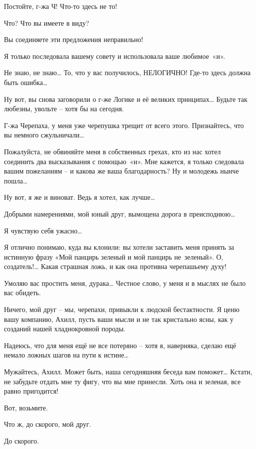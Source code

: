 \documentclass[../main.tex]{subfiles}
\begin{document}
\begin{dialogue}
 Постойте, г-жа Ч! Что-то здесь не то!

 Что? Что вы имеете в виду?

 Вы соединяете эти предложения неправильно!

 Я только последовала вашему совету и использовала ваше любимое~«и».

 Не знаю, не знаю\ldots{} То, что у вас получилось, НЕЛОГИЧНО! Где-то здесь должна быть ошибка\ldots{}

 Ну вот, вы снова заговорили о г-же Логике и её великих принципах\ldots{} Будьте так любезны, увольте \--- хотя бы на сегодня.

 Г-жа Черепаха, у меня уже черепушка трещит от всего этого. Признайтесь, что вы немного сжульничали\ldots{}

 Пожалуйста, не обвиняйте меня в собственных грехах, кто из нас хотел соединить два высказывания с помощью~«и». Мне кажется, я только следовала вашим пожеланиям \--- и какова же ваша благодарность? Ну и молодежь нынче пошла\ldots{}

 Ну вот, я же и виноват. Ведь я хотел, как лучше\ldots{}

 Добрыми намерениями, мой юный друг, вымощена дорога в преисподнюю\ldots{}

 Я чувствую себя ужасно\ldots{}

 Я отлично понимаю, куда вы клонили: вы хотели заставить меня принять за истинную фразу «Мой панцирь зеленый и мой панцирь не~зеленый». О, создатель!\ldots{} Какая страшная ложь, и как она противна черепашьему духу!

 Умоляю вас простить меня, дурака\ldots{} Честное слово, у меня и в мыслях не было вас обидеть.

 Ничего, мой друг \--- мы, черепахи, привыкли к людской бестактности. Я ценю вашу компанию, Ахилл, пусть ваши мысли и не так кристально ясны, как у созданий нашей хладнокровной породы.

 Надеюсь, что для меня ещё не все потеряно \--- хотя я, наверняка, сделаю ещё немало ложных шагов на пути к истине\ldots{}

 Мужайтесь, Ахилл. Может быть, наша сегодняшняя беседа вам поможет\ldots{} Кстати, не забудьте отдать мне ту фигу, что вы мне принесли. Хоть она и зеленая, все равно пригодится!

 Вот, возьмите.

 Что ж, до скорого, мой друг.

 До скорого.

\end{dialogue}
\end{document}

